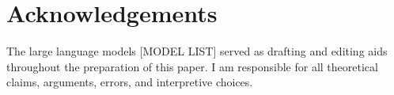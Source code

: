 \documentclass[12pt]{article}
\begin{document}
\appendix




\section*{Acknowledgements}

The large language models [MODEL LIST] served as drafting and editing aids throughout the preparation of this paper. I am responsible for all theoretical claims, arguments, errors, and interpretive choices.

\clearpage
\printbibliography
\end{document}

